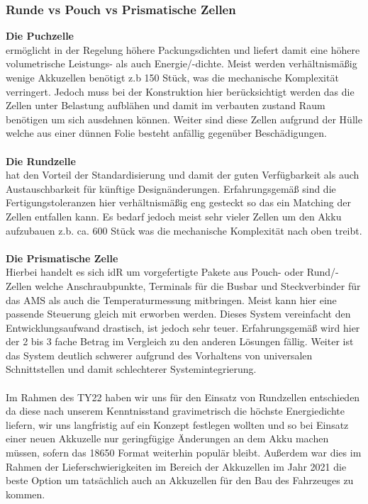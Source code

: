 \subsubsection{Runde vs Pouch vs Prismatische Zellen}

\textbf{Die Puchzelle}\\
ermöglicht in der Regelung höhere Packungsdichten und liefert damit eine höhere volumetrische Leistungs- als auch Energie/-dichte. Meist werden verhältnismäßig wenige Akkuzellen benötigt z.b 150 Stück, was die mechanische Komplexität verringert. Jedoch muss bei der Konstruktion hier berücksichtigt werden das die Zellen unter Belastung aufblähen und damit im verbauten zustand Raum benötigen um sich ausdehnen können. Weiter sind diese Zellen aufgrund der Hülle welche aus einer dünnen Folie besteht anfällig gegenüber Beschädigungen.\\
\\
\textbf{Die Rundzelle}\\
hat den Vorteil der Standardisierung und damit der guten Verfügbarkeit als auch Austauschbarkeit für künftige Designänderungen. Erfahrungsgemäß sind die Fertigungstoleranzen hier verhältnismäßig eng gesteckt so das ein Matching der Zellen entfallen kann. Es bedarf jedoch meist sehr vieler Zellen um den Akku aufzubauen z.b. ca. 600 Stück was die mechanische Komplexität nach oben treibt.\\
\\
\textbf{Die Prismatische Zelle}\\
Hierbei handelt es sich \ac{idR} um vorgefertigte Pakete aus Pouch- oder Rund/-Zellen welche Anschraubpunkte, Terminals für die Busbar und Steckverbinder für das \ac{AMS} als auch die Temperaturmessung mitbringen. Meist kann hier eine passende Steuerung gleich mit erworben werden. Dieses System vereinfacht den Entwicklungsaufwand drastisch, ist jedoch sehr teuer. Erfahrungsgemäß wird hier der 2 bis 3 fache Betrag im Vergleich zu den anderen Lösungen fällig. Weiter ist das System deutlich schwerer aufgrund des Vorhaltens von universalen Schnittstellen und damit schlechterer Systemintegrierung.\\
\\
Im Rahmen des TY22 haben wir uns für den Einsatz von Rundzellen entschieden da diese nach unserem Kenntnisstand gravimetrisch die höchste Energiedichte liefern, wir uns langfristig auf ein Konzept festlegen wollten und so bei Einsatz einer neuen Akkuzelle nur geringfügige Änderungen an dem Akku machen müssen, sofern das 18650 Format weiterhin populär bleibt. Außerdem war dies im Rahmen der Lieferschwierigkeiten im Bereich der Akkuzellen im Jahr 2021 die beste Option um tatsächlich auch an Akkuzellen für den Bau des Fahrzeuges zu kommen.


